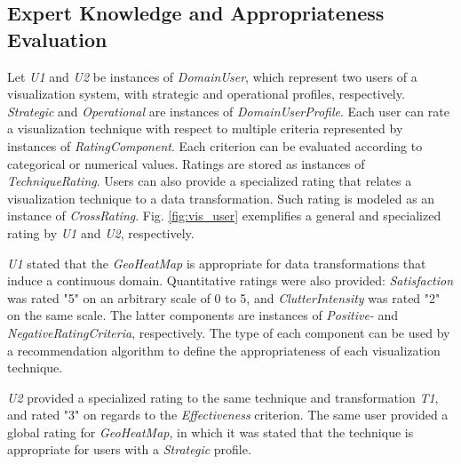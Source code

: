 \documentclass[]{interact}
\theoremstyle{plain}%
\theoremstyle{definition}
\theoremstyle{remark}
\theoremstyle{definition}
\begin{document}
\subsection{Expert Knowledge and Appropriateness Evaluation}

Let \textit{U1} and \textit{U2} be instances of \textit{DomainUser}, which represent two users of a visualization system, with strategic and operational profiles, respectively. \textit{Strategic} and \textit{Operational} are instances of \textit{DomainUserProfile}. Each user can rate a visualization technique with respect to multiple criteria represented by instances of \textit{RatingComponent}. Each criterion can be evaluated according to categorical or numerical values. Ratings are stored as instances of \textit{TechniqueRating}. Users can also provide a specialized rating that relates a visualization technique to a data transformation. Such rating is modeled as an instance of \textit{CrossRating}. Fig. \ref{fig:vis_user} exemplifies a general and specialized rating by \textit{U1} and \textit{U2}, respectively.

\textit{U1} stated that the \textit{GeoHeatMap} is appropriate for data transformations that induce a continuous domain. Quantitative ratings were also provided: \textit{Satisfaction} was rated "5" on an arbitrary scale of 0 to 5, and \textit{ClutterIntensity} was rated "2" on the same scale. The latter components are instances of \textit{Positive-} and \textit{NegativeRatingCriteria}, respectively. The type of each component can be used by a recommendation algorithm to define the appropriateness of each visualization technique.

\textit{U2} provided a specialized rating to the same technique and transformation \textit{T1}, and rated "3" on regards to the \textit{Effectiveness} criterion. The same user provided a global rating for \textit{GeoHeatMap}, in which it was stated that the technique is appropriate for users with a \textit{Strategic} profile.

%
%
\end{document}
